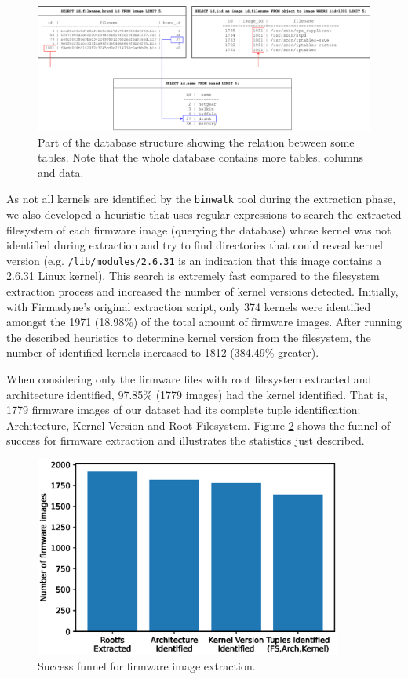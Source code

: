 \begin{figure}[H]
    \centering
    \includegraphics[width=1.0 \textwidth]{figs/SQL_Schema.pdf}
    \caption{Part of the database structure showing the relation between some tables. Note that the whole database contains more tables, columns and data.}
    \label{fig:sql-schema}
\end{figure}

As not all kernels are identified by the {\tt binwalk} tool during the extraction phase, we also developed a heuristic that uses regular expressions to search the extracted filesystem of each firmware image (querying the database) whose kernel was not identified during extraction and try to find directories that could reveal kernel version (e.g. {\tt /lib/modules/2.6.31} is an indication that this image contains a 2.6.31 Linux kernel). This search is extremely fast compared to the filesystem extraction process and increased the number of kernel versions detected. Initially, with Firmadyne's \cite{firmadyne} original extraction script, only 374 kernels were identified amongst the 1971 (18.98\%) of the total amount of firmware images. After running the described heuristics to determine kernel version from the filesystem, the number of identified kernels increased to 1812 (384.49\% greater).

When considering only the firmware files with root filesystem extracted and architecture identified, 97.85\% (1779 images) had the kernel identified. That is, 1779 firmware images of our dataset had its complete tuple identification: Architecture, Kernel Version and Root Filesystem. Figure \ref{fig:stats-funnel} shows the funnel of success for firmware extraction and illustrates the statistics just described.

\begin{figure}[H]
    \centering
    \includegraphics[width=0.90\textwidth]{figs/extraction_funnel.eps}
    \caption{Success funnel for firmware image extraction.}
    \label{fig:stats-funnel}
\end{figure}


